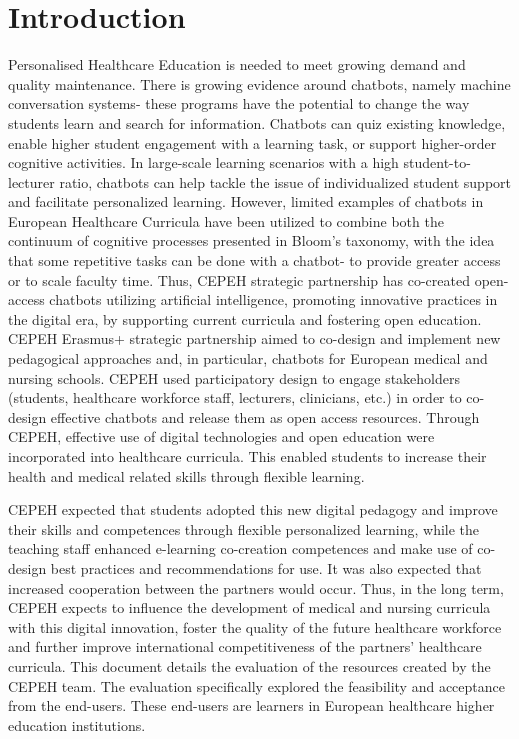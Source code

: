\documentclass[a4paper, nobind]{templates/ociamthesis}
\begin{document}
\flushbottom

\hypertarget{introduction}{%
\chapter*{Introduction}\label{introduction}}

\adjustmtc
{}

Personalised Healthcare Education is needed to meet growing demand and quality maintenance. There is growing evidence around chatbots, namely machine conversation systems- these programs have the potential to change the way students learn and search for information.
Chatbots can quiz existing knowledge, enable higher student engagement with a learning task, or support higher-order cognitive activities. In large-scale learning scenarios with a high student-to-lecturer ratio, chatbots can help tackle the issue of individualized student support and facilitate personalized learning. However, limited examples of chatbots in European Healthcare Curricula have been utilized to combine both the continuum of cognitive processes presented in Bloom's taxonomy, with the idea that some repetitive tasks can be done with a chatbot- to provide greater access or to scale faculty time.
Thus, CEPEH strategic partnership has co-created open-access chatbots utilizing artiﬁcial intelligence, promoting innovative practices in the digital era, by supporting current curricula and fostering open education.\\

CEPEH Erasmus+ strategic partnership aimed to co-design and implement new pedagogical approaches and, in particular, chatbots for European medical and nursing schools. CEPEH used participatory design to engage stakeholders (students, healthcare workforce staﬀ, lecturers, clinicians, etc.) in order to co-design eﬀective chatbots and release them as open access resources. Through CEPEH, effective use of digital technologies and open education were incorporated into healthcare curricula. This enabled students to increase their health and medical related skills through ﬂexible learning.

CEPEH expected that students adopted this new digital pedagogy and improve their skills and competences through ﬂexible personalized learning, while the teaching staﬀ enhanced e-learning co-creation competences and make use of co-design best practices and recommendations for use. It was also expected that increased cooperation between the partners would occur. Thus, in the long term, CEPEH expects to inﬂuence the development of medical and nursing curricula with this digital innovation, foster the quality of the future healthcare workforce and further improve international competitiveness of the partners' healthcare curricula. This document details the evaluation of the resources created by the CEPEH team.
The evaluation speciﬁcally explored the feasibility and acceptance from the end-users. These end-users are learners in European healthcare higher education institutions.
\end{document}
